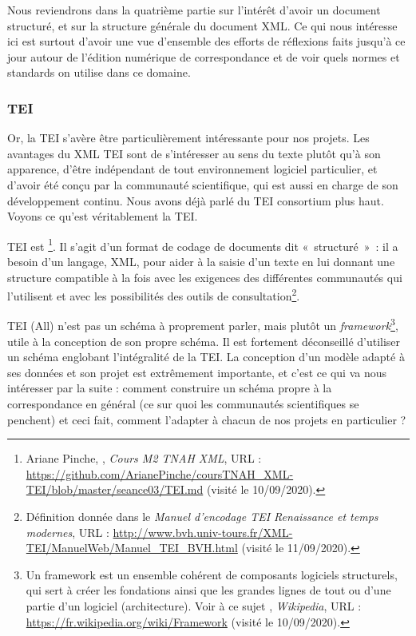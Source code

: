 Nous reviendrons dans la quatrième partie sur l'intérêt d'avoir un document structuré, et sur la structure générale du document XML. Ce qui nous intéresse ici est surtout d'avoir une vue d'ensemble des efforts de réflexions faits jusqu'à ce jour autour de l'édition numérique de correspondance et de voir quels normes et standards on utilise dans ce domaine.

\subsubsection{TEI}

Or, la TEI s'avère être particulièrement intéressante pour nos projets. 
Les avantages du XML TEI sont de s’intéresser au sens du texte plutôt qu’à son apparence, d'être indépendant de tout environnement logiciel particulier, et d'avoir été conçu par la communauté scientifique, qui est aussi en charge de son développement continu.
Nous avons déjà parlé du TEI consortium plus haut.
Voyons ce qu'est véritablement la TEI.

TEI est \footnote{Ariane Pinche, , \emph{Cours M2 TNAH XML}, URL : \url{https://github.com/ArianePinche/coursTNAH_XML-TEI/blob/master/seance03/TEI.md} (visité le 10/09/2020).}.  Il s'agit d'un format de codage de documents dit « structuré » : il a besoin d'un langage, XML, pour aider à la saisie d'un texte en lui donnant une structure compatible à la fois avec les exigences des différentes communautés qui l'utilisent et avec les possibilités des outils de consultation\footnote{Définition donnée dans le \emph {Manuel d'encodage TEI
Renaissance et temps modernes}, URL : \url{http://www.bvh.univ-tours.fr/XML-TEI/ManuelWeb/Manuel_TEI_BVH.html} (visité le 11/09/2020).}. 

TEI (All) n’est pas un schéma à proprement parler, mais plutôt un \emph{framework}\footnote{Un framework est un ensemble cohérent de composants logiciels structurels, qui sert à créer les fondations ainsi que les grandes lignes de tout ou d’une partie d'un logiciel (architecture). Voir à ce sujet , \emph{Wikipedia}, URL : \url{https://fr.wikipedia.org/wiki/Framework} (visité le 10/09/2020).}, utile à la conception de son propre schéma. Il est
fortement déconseillé d’utiliser un schéma englobant l’intégralité de la
TEI. La conception d’un modèle adapté à ses données et son projet
est extrêmement importante, et c'est ce qui va nous intéresser par la suite : comment construire un schéma propre à la correspondance en général (ce sur quoi les communautés scientifiques se penchent) et ceci fait, comment l'adapter à chacun de nos projets en particulier ?

